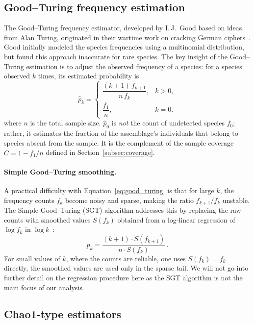 ﻿\documentclass{article}
\begin{document}
\subsection{Good--Turing frequency estimation}

The Good--Turing frequency estimator, developed by I.\,J.\ Good based on ideas from Alan Turing, originated in their wartime work on cracking German ciphers~\cite{good1953,good2000}. Good initially modeled the species frequencies using a multinomial distribution, but found this approach inaccurate for rare species. The key insight of the Good--Turing estimation is to adjust the observed frequency of a species: for a species observed $k$ times, its estimated probability is
\begin{equation}
    \label{eq:good_turing}
    \hat{p}_k =
    \begin{cases}   
        \dfrac{(k+1)\,f_{k+1}}{n\,f_k}, & k > 0, \\[6pt]
        \dfrac{f_1}{n}, & k = 0.
    \end{cases}
\end{equation}
where $n$ is the total sample size.
$\hat{p}_0$ is \emph{not} the count of undetected species $f_0$; rather, it estimates the fraction of the assemblage's individuals that belong to species absent from the sample. It is the complement of the sample coverage $\hat{C} = 1 - f_1/n$ defined in 
Section~\ref{subsec:coverage}.

\paragraph{Simple Good--Turing smoothing.}
A practical difficulty with Equation~\eqref{eq:good_turing} is that for large $k$, the frequency counts $f_k$ become noisy and sparse, making the ratio $f_{k+1}/f_k$ unstable. The Simple Good--Turing (SGT) algorithm addresses this by replacing the raw counts with smoothed values $S(f_k)$ obtained from a log-linear regression of $\log f_k$ in
$\log k$~\cite{gale1995}:
\begin{equation}\label{eq:sgt}
    p_k = \frac{(k+1) \cdot S(f_{k+1})}{n \cdot S(f_k)}\,.
\end{equation}
For small values of $k$, where the counts are reliable, one uses $S(f_k) = f_k$ directly, the smoothed values are used only in the sparse tail. We will not go into further detail on the regression procedure here as the SGT algorithm is not the main focus of our analysis.


\subsection{Chao1-type estimators}
\end{document}
